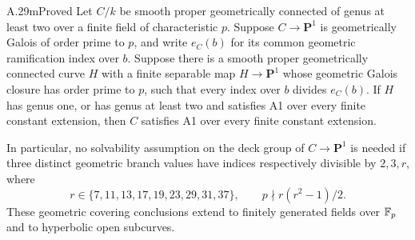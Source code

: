 \begin{claim}{A.29m}{Proved}
Let $C/k$ be smooth proper geometrically connected of genus at
least two over a finite field of characteristic $p$. Suppose
$C\to\mathbf P^1$ is geometrically Galois of order prime to $p$,
and write $e_C(b)$ for its common geometric ramification index
over $b$. Suppose there is a smooth proper geometrically
connected curve $H$ with a finite separable map
$H\to\mathbf P^1$ whose geometric Galois closure has order
prime to $p$, such that every index over $b$ divides $e_C(b)$.
If $H$ has genus one, or has genus at least two and satisfies
A1 over every finite constant extension, then $C$ satisfies
A1 over every finite constant extension.

In particular, no solvability assumption on the deck group of
$C\to\mathbf P^1$ is needed if three distinct geometric branch
values have indices respectively divisible by $2,3,r$, where
\[
 r\in\{7,11,13,17,19,23,29,31,37\},\qquad
 p\nmid r(r^2-1)/2.
\]
These geometric covering conclusions extend to finitely
generated fields over $\mathbb F_p$ and to hyperbolic open subcurves.
\end{claim}
